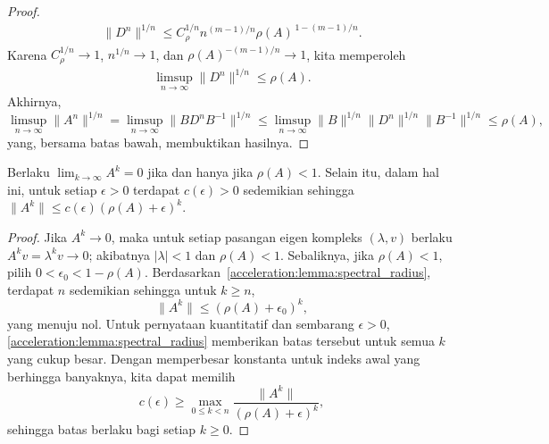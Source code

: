 \begin{proof}
\begin{equation}
\begin{aligned}
            \|D^n\|^{1/n}
            \leq C_{\rho}^{1/n}n^{(m-1)/n}
            \rho(A)^{\,1-(m-1)/n}.
        \end{aligned}
    \end{equation}
    Karena \(C_{\rho}^{1/n}\rightarrow1\), \(n^{1/n}\rightarrow1\), dan \(\rho(A)^{-(m-1)/n}\rightarrow1\), kita memperoleh
    \begin{equation}
        \begin{aligned}
            \limsup_{n\rightarrow\infty}\|D^n\|^{1/n}
            \leq\rho(A).
        \end{aligned}
    \end{equation}
    Akhirnya,
    \begin{equation}
        \limsup_{n\rightarrow\infty}\|A^n\|^{1/n}
        =\limsup_{n\rightarrow\infty}\|BD^nB^{-1}\|^{1/n}
        \leq\limsup_{n\rightarrow\infty}
        \|B\|^{1/n}\|D^n\|^{1/n}\|B^{-1}\|^{1/n}
        \leq\rho(A),
    \end{equation}
    yang, bersama batas bawah, membuktikan hasilnya.
\end{proof}

\begin{cor}\label{acceleration:cor:spectral_radius}
    Berlaku \(\lim_{k\rightarrow\infty}A^k=0\) jika dan hanya jika \(\rho(A)<1\). Selain itu, dalam hal ini, untuk setiap \(\epsilon>0\) terdapat \(c(\epsilon)>0\) sedemikian sehingga \(\|A^k\|\leq c(\epsilon)(\rho(A)+\epsilon)^k\).
\end{cor}
\begin{proof}
    Jika \(A^k\rightarrow0\), maka untuk setiap pasangan eigen kompleks \((\lambda,v)\) berlaku \(A^kv=\lambda^kv\rightarrow0\); akibatnya \(|\lambda|<1\) dan \(\rho(A)<1\). Sebaliknya, jika \(\rho(A)<1\), pilih \(0<\epsilon_0<1-\rho(A)\). Berdasarkan~\cref{acceleration:lemma:spectral_radius}, terdapat \(n\) sedemikian sehingga untuk \(k\geq n\),
    \begin{equation}
        \|A^k\|\leq(\rho(A)+\epsilon_0)^k,
    \end{equation}
    yang menuju nol. Untuk pernyataan kuantitatif dan sembarang \(\epsilon>0\), \cref{acceleration:lemma:spectral_radius} memberikan batas tersebut untuk semua \(k\) yang cukup besar. Dengan memperbesar konstanta untuk indeks awal yang berhingga banyaknya, kita dapat memilih
    \begin{equation}
        c(\epsilon)\geq
        \max_{0\leq k<n}
        \frac{\|A^k\|}{(\rho(A)+\epsilon)^k},
    \end{equation}
    sehingga batas berlaku bagi setiap \(k\geq0\).
\end{proof}

